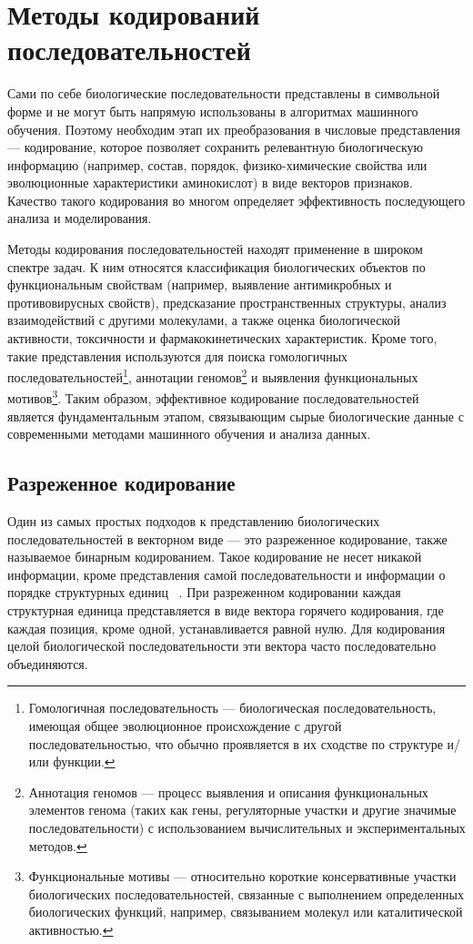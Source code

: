 \documentclass[specification,annotation,times]{itmo-student-thesis}
\begin{document}
\section{Методы кодирований последовательностей}\label{sec:encoding-methods}

Сами по себе биологические последовательности представлены в символьной форме и не могут быть напрямую использованы в алгоритмах машинного обучения. Поэтому необходим этап их преобразования в числовые представления — кодирование, которое позволяет сохранить релевантную биологическую информацию (например, состав, порядок, физико-химические свойства или эволюционные характеристики аминокислот) в виде векторов признаков. Качество такого кодирования во многом определяет эффективность последующего анализа и моделирования.

Методы кодирования последовательностей находят применение в широком спектре задач. К ним относятся классификация биологических объектов по функциональным свойствам (например, выявление антимикробных и противовирусных свойств), предсказание пространственных структуры, анализ взаимодействий с другими молекулами, а также оценка биологической активности, токсичности и фармакокинетических характеристик. Кроме того, такие представления используются для поиска гомологичных последовательностей\footnote{Гомологичная последовательность --- биологическая последовательность, имеющая общее эволюционное происхождение с другой последовательностью, что обычно проявляется в их сходстве по структуре и/или функции.}, аннотации геномов\footnote{Аннотация геномов --- процесс выявления и описания функциональных элементов генома (таких как гены, регуляторные участки и другие значимые последовательности) с использованием вычислительных и экспериментальных методов.} и выявления функциональных мотивов\footnote{Функциональные мотивы --- относительно короткие консервативные участки биологических последовательностей, связанные с выполнением определенных биологических функций, например, связыванием молекул или каталитической активностью.}. Таким образом, эффективное кодирование последовательностей является фундаментальным этапом, связывающим сырые биологические данные с современными методами машинного обучения и анализа данных.

\subsection{Разреженное кодирование}\label{sec:one-hot-enc}

Один из самых простых подходов к представлению биологических последовательностей в векторном виде --- это разреженное кодирование, также называемое бинарным кодированием. Такое кодирование не несет никакой информации, кроме представления самой последовательности и информации о порядке структурных единиц ~\cite{usmani2018prediction}. При разреженном кодировании каждая структурная единица представляется в виде вектора горячего кодирования, где каждая позиция, кроме одной, устанавливается равной нулю. Для кодирования целой биологической последовательности эти вектора часто последовательно объединяются. 
\end{document}
